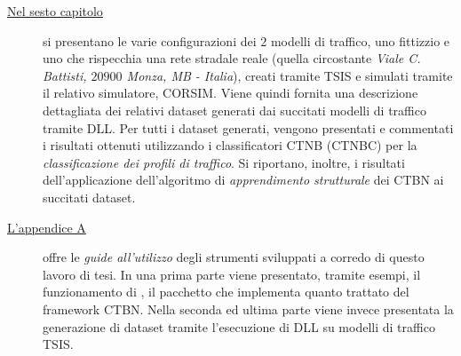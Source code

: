 \begin{description}
	\item[{\hyperref[cap:esperimenti]{Nel sesto capitolo}}]
	si presentano le varie configurazioni dei $2$ modelli di traffico, uno fittizzio e uno che rispecchia una rete stradale reale (quella circostante \emph{Viale C. Battisti, $20900$ Monza, MB - Italia}), creati tramite \acs{TSIS} e simulati tramite il relativo simulatore, \acs{CORSIM}. Viene quindi fornita una descrizione dettagliata dei relativi dataset generati dai succitati modelli di traffico tramite  \acs{DLL}. Per tutti i dataset generati, vengono presentati e commentati i risultati ottenuti utilizzando i classificatori \acs{CTNB} (\acs{CTNBC}) per la \emph{classificazione dei profili di traffico}. Si riportano, inoltre, i risultati dell'applicazione dell'algoritmo di \emph{apprendimento strutturale} dei \acs{CTBN} ai succitati dataset.
	\item[{\hyperref[cap:guide]{L'appendice A}}]
	offre le \emph{guide all'utilizzo} degli strumenti sviluppati a corredo di questo lavoro di tesi. In una prima parte viene presentato, tramite esempi, il funzionamento di , il pacchetto  che implementa quanto trattato del framework \acs{CTBN}. Nella seconda ed ultima parte viene invece presentata la generazione di dataset tramite l'esecuzione di  \acs{DLL} su modelli di traffico \acs{TSIS}.
\end{description}



